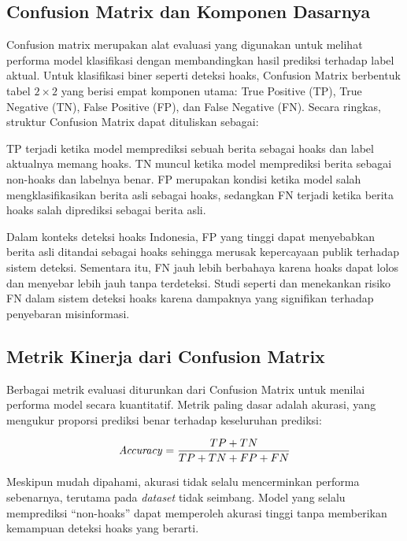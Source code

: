 \subsection{Confusion Matrix dan Komponen Dasarnya}

Confusion matrix merupakan alat evaluasi yang digunakan untuk melihat performa model klasifikasi dengan membandingkan hasil prediksi terhadap label aktual. Untuk klasifikasi biner seperti deteksi hoaks, Confusion Matrix berbentuk tabel $2 \times 2$ yang berisi empat komponen utama: True Positive (TP), True Negative (TN), False Positive (FP), dan False Negative (FN). Secara ringkas, struktur Confusion Matrix dapat dituliskan sebagai:



TP terjadi ketika model memprediksi sebuah berita sebagai hoaks dan label aktualnya memang hoaks. TN muncul ketika model memprediksi berita sebagai non-hoaks dan labelnya benar. FP merupakan kondisi ketika model salah mengklasifikasikan berita asli sebagai hoaks, sedangkan FN terjadi ketika berita hoaks salah diprediksi sebagai berita asli.

Dalam konteks deteksi hoaks Indonesia, FP yang tinggi dapat menyebabkan berita asli ditandai sebagai hoaks sehingga merusak kepercayaan publik terhadap sistem deteksi. Sementara itu, FN jauh lebih berbahaya karena hoaks dapat lolos dan menyebar lebih jauh tanpa terdeteksi. Studi seperti \textcite{triyono2023indonesian} dan \textcite{safira2023comparative} menekankan risiko FN dalam sistem deteksi hoaks karena dampaknya yang signifikan terhadap penyebaran misinformasi.

\subsection{Metrik Kinerja dari Confusion Matrix}

Berbagai metrik evaluasi diturunkan dari Confusion Matrix untuk menilai performa model secara kuantitatif. Metrik paling dasar adalah akurasi, yang mengukur proporsi prediksi benar terhadap keseluruhan prediksi:

\begin{equation}
\text{\textit{Accuracy}} = \frac{TP + TN}{TP + TN + FP + FN} \label{eq=rumus-akurasi}
\end{equation}

Meskipun mudah dipahami, akurasi tidak selalu mencerminkan performa sebenarnya, terutama pada \textit{dataset} tidak seimbang. Model yang selalu memprediksi “non-hoaks” dapat memperoleh akurasi tinggi tanpa memberikan kemampuan deteksi hoaks yang berarti.


